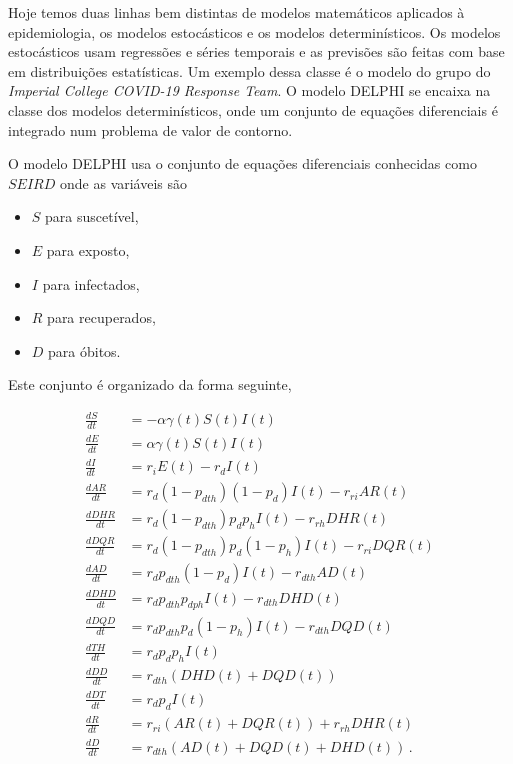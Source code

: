 \documentclass[12pt]{article}
\begin{document}
Hoje temos duas linhas bem distintas de modelos matemáticos aplicados à epidemiologia, os modelos estocásticos e os modelos determinísticos. Os modelos estocásticos usam regressões e séries temporais e as previsões são feitas com base em distribuições estatísticas. Um exemplo dessa classe é o modelo do grupo do \textit{Imperial College COVID-19 Response Team}\cite{impirial1}. O modelo DELPHI\cite{delphi} se encaixa na classe dos modelos determinísticos, onde um conjunto de equações diferenciais é integrado num problema de valor de contorno\cite{2008elementary}. 

O modelo DELPHI usa o conjunto de equações diferenciais conhecidas como $SEIRD$ onde as variáveis  são 
\begin{itemize}
\item $S$ para suscetível,
\item $E$ para exposto,
\item $I$ para infectados,
\item $R$ para recuperados,
\item $D$ para óbitos.
\end{itemize}
Este conjunto é organizado da forma seguinte,

\begin{align*}
 \frac{dS}{dt} & = - \alpha \gamma(t) S(t) I(t) \\
 \frac{dE}{dt} & = \alpha \gamma(t) S(t) I(t) \\
 \frac{dI}{dt} & = r_i E(t) - r_d I(t) \\
 \frac{d AR}{dt} & = r_d(1 - p_{dth})(1 - p_d) I(t) - r_{ri} AR(t) \\
 \frac{d DHR}{dt} & =  r_d (1 - p_{dth}) p_d p_h I(t) - r_{rh} DHR(t) \\
 \frac{d DQR}{dt} & = r_d (1 - p_{dth}) p_d (1 - p_h) I(t) - r_{ri} DQR(t) \\
 \frac{d AD}{dt} & =  r_d p_{dth} (1 - p_d) I(t) - r_{dth} AD(t) \\
 \frac{d DHD}{dt} & =  r_d p_{dth} p_{dph} I(t) - r_{dth} DHD(t) \\
 \frac{d DQD}{dt} & =  r_d p_{dth} p_d(1 - p_h) I(t) - r_{dth} DQD(t) \\
 \frac{d TH}{dt} & = r_d p_d p_h I(t)  \\
 \frac{d DD}{dt} & =  r_{dth} (DHD(t) + DQD(t)) \\
 \frac{d DT}{dt} & = r_d  p_d I(t) \\
 \frac{d R}{dt} & =  r_{ri} (AR(t) + DQR(t)) + r_{rh} DHR(t) \\
 \frac{d D}{dt} & =  r_{dth} (AD(t) + DQD(t) + DHD(t)) \, .
\end{align*}
\end{document}
